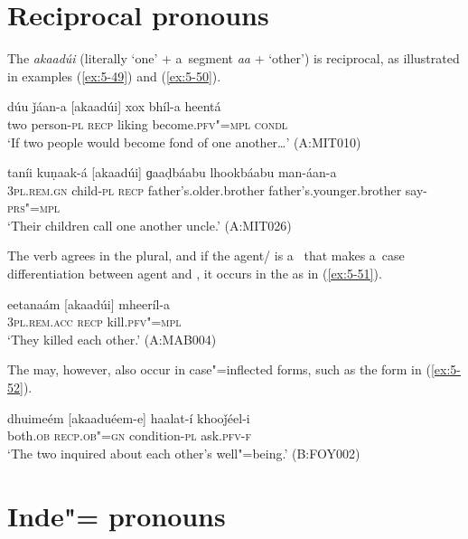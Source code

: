 \section{Reciprocal pronouns}
\label{sec:5-6}

The  \textit{akaadúi} (literally `one' + a~segment \textit{aa} + `other') is reciprocal,
as illustrated in examples (\ref{ex:5-49}) and (\ref{ex:5-50}).

\begin{exe}
\ex
\label{ex:5-49}
\gll dúu ǰáan-a [akaadúi] xox bhíl-a heentá\\
two person-\textsc{pl} \textsc{recp} liking become.\textsc{pfv"=mpl} \textsc{condl}\\
\glt `If two people would become fond of one another{\ldots}' (A:MIT010)

\ex
\label{ex:5-50}
\gll taníi kuṇaak-á [akaadúi] ɡaaḍbáabu lhookbáabu man-áan-a\\
\textsc{3pl.rem.gn} child-\textsc{pl} \textsc{recp} father's.older.brother father's.younger.brother say-\textsc{prs"=mpl} \\
\glt `Their children call one another uncle.' (A:MIT026)
\end{exe}

The  verb agrees in the plural, and if the agent/ is a~ that makes a~case differentiation between agent and , it occurs in the  as in (\ref{ex:5-51}).
\begin{exe}
\ex
\label{ex:5-51}
\gll eetanaám [akaadúi] mheeríl-a\\
\textsc{3pl.rem.acc} \textsc{recp } kill.\textsc{pfv"=mpl}\\
\glt `They killed each other.' (A:MAB004)
\end{exe}

The  may, however, also occur in case"=inflected forms, such as the  form in (\ref{ex:5-52}). 
\begin{exe}
\ex
\label{ex:5-52}
\gll dhuimeém [akaaduéem-e] haalat-í khooǰéel-i\\
both.\textsc{ob} \textsc{recp.ob"=gn } condition-\textsc{pl} ask.\textsc{pfv-f}\\
\glt `The two inquired about each other's well"=being.' (B:FOY002)
\end{exe}

\section{Inde"= pronouns}
\label{sec:5-7}


